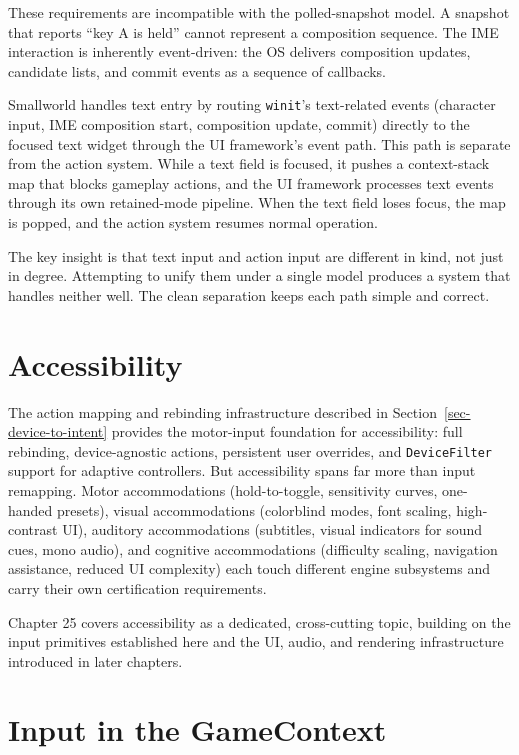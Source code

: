 \documentclass[
  11pt,
  letterpaper,
  DIV=11,
  numbers=noendperiod,
  twoside,
  open=right]{scrreprt}
\begin{document}
These requirements are incompatible with the polled-snapshot model. A
snapshot that reports ``key A is held'' cannot represent a composition
sequence. The IME interaction is inherently event-driven: the OS
delivers composition updates, candidate lists, and commit events as a
sequence of callbacks.

Smallworld handles text entry by routing \texttt{winit}'s text-related
events (character input, IME composition start, composition update,
commit) directly to the focused text widget through the UI framework's
event path. This path is separate from the action system. While a text
field is focused, it pushes a context-stack map that blocks gameplay
actions, and the UI framework processes text events through its own
retained-mode pipeline. When the text field loses focus, the map is
popped, and the action system resumes normal operation.

The key insight is that text input and action input are different in
kind, not just in degree. Attempting to unify them under a single model
produces a system that handles neither well. The clean separation keeps
each path simple and correct.

\section{Accessibility}\label{sec-accessibility}

The action mapping and rebinding infrastructure described in
Section~\ref{sec-device-to-intent} provides the motor-input foundation
for accessibility: full rebinding, device-agnostic actions, persistent
user overrides, and \texttt{DeviceFilter} support for adaptive
controllers. But accessibility spans far more than input remapping.
Motor accommodations (hold-to-toggle, sensitivity curves, one-handed
presets), visual accommodations (colorblind modes, font scaling,
high-contrast UI), auditory accommodations (subtitles, visual indicators
for sound cues, mono audio), and cognitive accommodations (difficulty
scaling, navigation assistance, reduced UI complexity) each touch
different engine subsystems and carry their own certification
requirements.

Chapter 25 covers accessibility as a dedicated, cross-cutting topic,
building on the input primitives established here and the UI, audio, and
rendering infrastructure introduced in later chapters.

\section{Input in the GameContext}\label{input-in-the-gamecontext}
\end{document}
